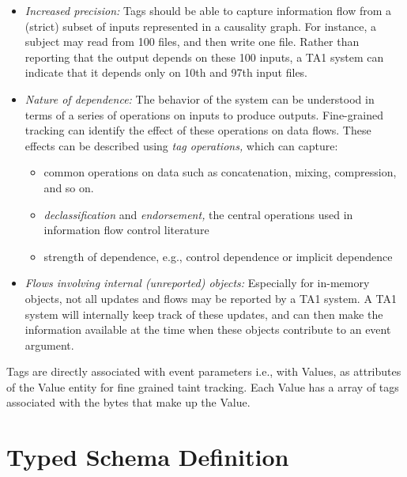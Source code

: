 \documentclass[10pt, conference, onecolumn]{IEEEtran}
\begin{document}
\begin{itemize}

  \item {\em Increased precision:} Tags should be able to capture
    information flow from a (strict) subset of inputs represented in a
    causality graph. For instance, a subject may read from 100 files,
    and then write one file. Rather than reporting that the output
    depends on these 100 inputs, a TA1 system can indicate that it
    depends only on 10th and 97th input files.

  \item {\em Nature of dependence:} The behavior of the system can be
    understood in terms of a series of operations on inputs to produce
    outputs. Fine-grained tracking can identify the effect of these
    operations on data flows. These effects can be described using
    {\em tag operations,} which can capture:

    \begin{itemize}

      \item common operations on data such as concatenation, mixing,
        compression, and so on.

      \item {\em declassification} and {\em endorsement,} the central
        operations used in information flow control literature

      \item strength of dependence, e.g., control dependence or
        implicit dependence
        
    \end{itemize}

   \item {\em Flows involving internal (unreported) objects:}
     Especially for in-memory objects, not all updates and flows may
     be reported by a TA1 system. A TA1 system will internally keep
     track of these updates, and can then make the information
     available at the time when these objects contribute to an event
     argument.

\end{itemize}

Tags are directly associated with event parameters i.e., with Values,
as attributes of the Value entity for fine grained taint tracking.
Each Value has a array of tags associated with the bytes that make up
the Value.

\section{Typed Schema Definition}
\label{sec:syntax}
\end{document}
